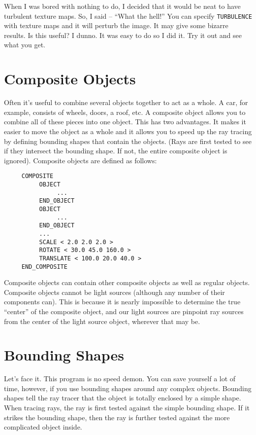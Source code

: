 When I was bored with nothing to do, I decided that it would be neat
to have turbulent texture maps.  So, I said -- ``What the hell!''  You
can specify
{\tt TURBULENCE}%
with texture maps and it will perturb the
image.  It may give some bizarre results.  Is this useful?  I dunno.
It was easy to do so I did it.  Try it out and see what you get.

\section{Composite Objects}

Often it's useful to combine several objects together to act as a whole.  A
car, for example, consists of wheels, doors, a roof, etc.  A composite object
allows you to combine all of these pieces into one object.  This has two
advantages.  It makes it easier to move the object as a whole and it allows
you to speed up the ray tracing by defining bounding shapes that contain the
objects.  (Rays are first tested to see if they intersect the bounding shape.
If not, the entire composite object is ignored).  Composite objects are
defined as follows:
\begin{verbatim}
     COMPOSITE
          OBJECT
               ...
          END_OBJECT
          OBJECT
               ...
          END_OBJECT
          ...
          SCALE < 2.0 2.0 2.0 >
          ROTATE < 30.0 45.0 160.0 >
          TRANSLATE < 100.0 20.0 40.0 >
     END_COMPOSITE
\end{verbatim}
Composite objects can contain other composite objects as well as regular
objects. Composite%
objects cannot be light sources (although any number of
their components can).  This is because it is nearly impossible to determine
the true ``center'' of the composite object, and our light sources are pinpoint
ray sources from the center of the light source object, wherever that may be.

\section{Bounding Shapes}

Let's face it.  This program is no speed demon.  You can save yourself a lot
of time, however, if you use bounding shapes around any complex objects.
Bounding shapes tell the ray tracer that the object is totally enclosed by a
simple shape.  When tracing rays, the ray is first tested against the simple
bounding shape.  If it strikes the bounding shape, then the ray is further
tested against the more complicated object inside.

